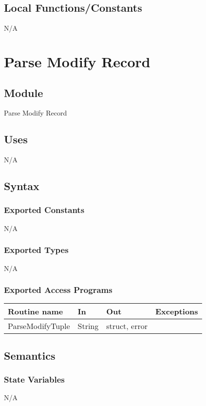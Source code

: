 \documentclass[12pt]{article}
\begin{document}
\subsection{Local Functions/Constants}
N/A


\newpage

\section{Parse Modify Record}

\subsection{Module}
Parse Modify Record

\subsection{Uses}
N/A

\subsection{Syntax}
\subsubsection{Exported Constants}
N/A

\subsubsection{Exported Types}
N/A

\subsubsection{Exported Access Programs}
\begin{tabular}{| l | l | l | l |}
\hline
\textbf{Routine name} & \textbf{In} & \textbf{Out} & \textbf{Exceptions}\\
\hline
{\color{red}ParseModifyTuple} & {\color{red}String} & {\color{red}struct, error} & \\
\hline
\end{tabular}

\subsection{Semantics}
\subsubsection{State Variables}
N/A
\end{document}

